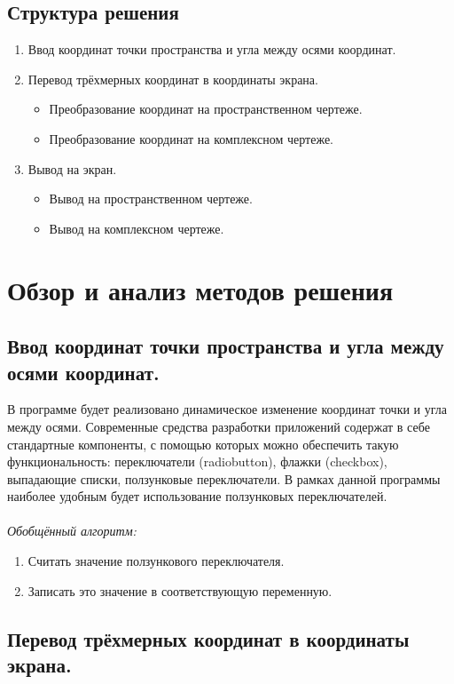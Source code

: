 \documentclass[13pt]{extarticle}
\begin{document}
 \subsection{Структура решения}
 	\begin{enumerate}
 	\item Ввод координат точки пространства и угла между осями координат.
 	\item Перевод трёхмерных координат в координаты экрана. 
 	\begin{itemize}
 		\item Преобразование координат на пространственном чертеже.
 		\item Преобразование координат на комплексном чертеже.
 	\end{itemize}
 	\item Вывод на экран.
 	\begin{itemize}
 		\item Вывод на пространственном чертеже.
 		\item Вывод на комплексном чертеже.
 	\end{itemize}
 	\end{enumerate}
 
\section{Обзор и анализ методов решения}
 \subsection{Ввод координат точки пространства и угла между осями координат.}
 В программе будет реализовано динамическое изменение координат точки и угла между осями. Современные средства разработки приложений содержат в себе стандартные компоненты, с помощью которых можно обеспечить такую функциональность: переключатели (radiobutton), флажки (checkbox), выпадающие списки, ползунковые переключатели. В рамках данной программы наиболее удобным будет использование ползунковых переключателей.
 \\\\
 \emph{Обобщённый алгоритм:}
 	\begin{enumerate}
 		\item Считать значение ползункового переключателя.
 		\item Записать это значение в соответствующую переменную.
 	\end{enumerate}
\subsection{Перевод трёхмерных координат в координаты экрана.}
\end{document}
